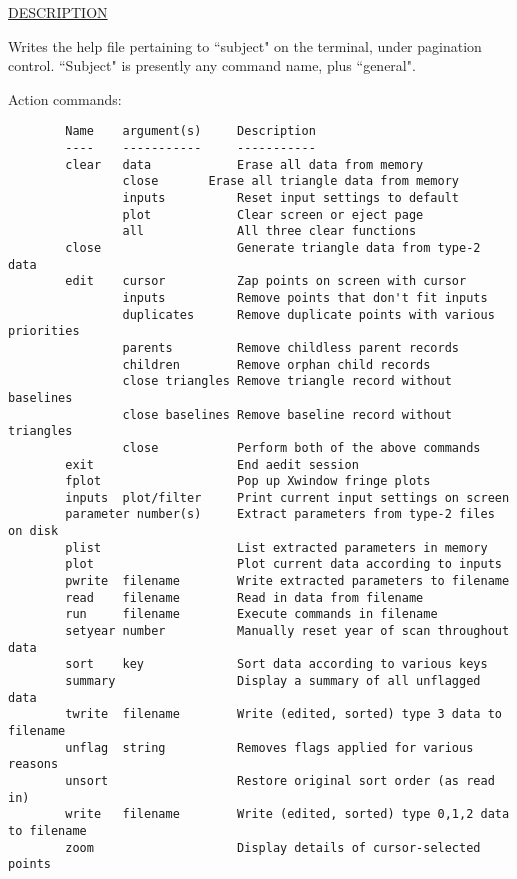 \underline{DESCRIPTION}
\begin{list}{}{\setlength{\leftmargin}{0.5in}
     \setlength{\rightmargin}{0in}}
\item
Writes the help file pertaining to ``subject" on the 
terminal, under pagination control.  ``Subject" is
presently any command name, plus ``general".
\item
Action commands:
\item
\begin{verbatim}
        Name    argument(s)     Description
        ----    -----------     -----------
        clear   data            Erase all data from memory
                close		Erase all triangle data from memory
                inputs          Reset input settings to default
                plot            Clear screen or eject page
                all             All three clear functions
        close                   Generate triangle data from type-2 data
        edit    cursor          Zap points on screen with cursor
                inputs          Remove points that don't fit inputs
                duplicates      Remove duplicate points with various priorities
                parents         Remove childless parent records
                children        Remove orphan child records
                close triangles Remove triangle record without baselines
                close baselines Remove baseline record without triangles
                close           Perform both of the above commands
        exit                    End aedit session
        fplot                   Pop up Xwindow fringe plots
        inputs  plot/filter     Print current input settings on screen
        parameter number(s)     Extract parameters from type-2 files on disk
        plist                   List extracted parameters in memory
        plot                    Plot current data according to inputs
        pwrite  filename        Write extracted parameters to filename
        read    filename        Read in data from filename
        run     filename        Execute commands in filename
        setyear number          Manually reset year of scan throughout data
        sort    key             Sort data according to various keys
        summary                 Display a summary of all unflagged data
        twrite  filename        Write (edited, sorted) type 3 data to filename
        unflag  string          Removes flags applied for various reasons
        unsort                  Restore original sort order (as read in)
        write   filename        Write (edited, sorted) type 0,1,2 data to filename
        zoom                    Display details of cursor-selected points



\end{verbatim}
\end{list}
